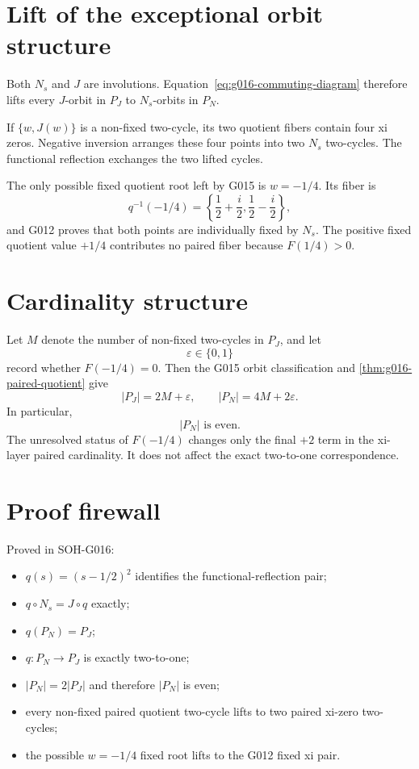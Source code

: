 \section{Lift of the exceptional orbit structure}

Both $N_s$ and $J$ are involutions.  Equation~\eqref{eq:g016-commuting-diagram}
therefore lifts every $J$-orbit in $P_J$ to $N_s$-orbits in $P_N$.

If $\{w,J(w)\}$ is a non-fixed two-cycle, its two quotient fibers contain four
xi zeros.  Negative inversion arranges these four points into two
$N_s$ two-cycles.  The functional reflection exchanges the two lifted cycles.

The only possible fixed quotient root left by G015 is $w=-1/4$.  Its fiber is
\begin{equation}
 q^{-1}(-1/4)
 =\left\{\frac12+\frac{i}{2},\frac12-\frac{i}{2}\right\},
 \label{eq:g016-minus-quarter-fiber}
\end{equation}
and G012 proves that both points are individually fixed by $N_s$.
The positive fixed quotient value $+1/4$ contributes no paired fiber because
$F(1/4)>0$.

\section{Cardinality structure}

Let $M$ denote the number of non-fixed two-cycles in $P_J$, and let
\[
 \varepsilon\in\{0,1\}
\]
record whether $F(-1/4)=0$.  Then the G015 orbit classification and
\cref{thm:g016-paired-quotient} give
\begin{equation}
 |P_J|=2M+\varepsilon,
 \qquad
 |P_N|=4M+2\varepsilon.
 \label{eq:g016-cardinality-structure}
\end{equation}
In particular,
\begin{equation}
 \boxed{|P_N|\text{ is even}.}
 \label{eq:g016-PN-even}
\end{equation}
The unresolved status of $F(-1/4)$ changes only the final $+2$ term in the
xi-layer paired cardinality.  It does not affect the exact two-to-one
correspondence.

\section{Proof firewall}

Proved in SOH-G016:
\begin{itemize}
 \item $q(s)=(s-1/2)^2$ identifies the functional-reflection pair;
 \item $q\circ N_s=J\circ q$ exactly;
 \item $q(P_N)=P_J$;
 \item $q:P_N\to P_J$ is exactly two-to-one;
 \item $|P_N|=2|P_J|$ and therefore $|P_N|$ is even;
 \item every non-fixed paired quotient two-cycle lifts to two paired xi-zero
       two-cycles;
 \item the possible $w=-1/4$ fixed root lifts to the G012 fixed xi pair.
\end{itemize}

